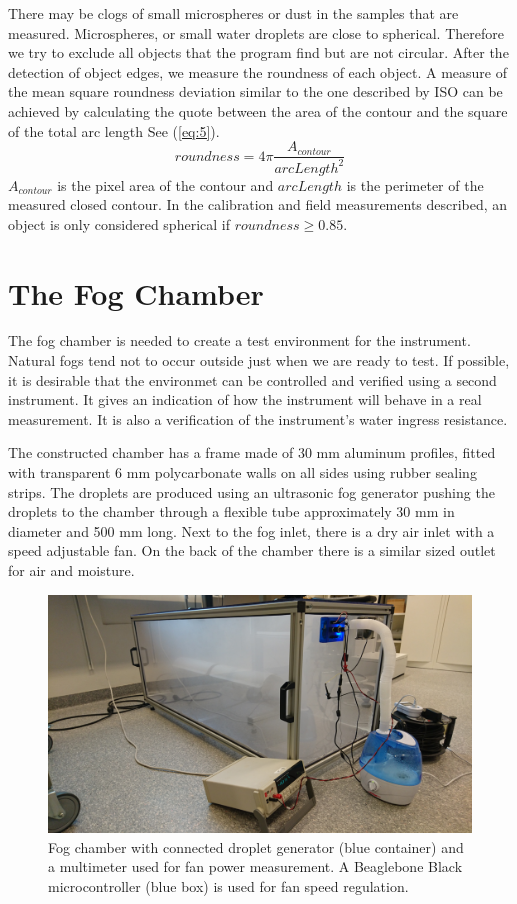 There may be clogs of small microspheres or dust in the samples that are measured. Microspheres, or small water droplets are close to spherical. Therefore we try to exclude all objects that the program find but are not circular. After the detection of object edges, we measure the roundness of each object. A measure of the mean square roundness deviation similar to the one described by ISO \cite{iso12181} can be achieved by calculating the quote between the area of the contour and the square of the total arc length See (\cref{eq:5}).
\begin{equation}
roundness = 4\pi \frac{A_{contour}}{arcLength^2}
\label{eq:5}
\end{equation}
$A_{contour}$ is the pixel area of the contour and $arcLength$ is the perimeter of the measured closed contour. In the calibration and field measurements described, an object is only considered spherical if $roundness \geq 0.85$.


\section{The Fog Chamber}
The fog chamber is needed to create a test environment for the instrument. Natural fogs tend not to occur outside just when we are ready to test. If possible, it is desirable that the environmet can be controlled and verified using a second instrument. It gives an indication of how the instrument will behave in a real measurement. It is also a verification of the instrument’s water ingress resistance.

The constructed chamber has a frame made of 30 mm aluminum profiles, fitted with transparent 6 mm polycarbonate walls on all sides using rubber sealing strips. The droplets are produced using an ultrasonic fog generator pushing the droplets to the chamber through a flexible tube approximately 30 mm in diameter and 500 mm long. Next to the fog inlet, there is a dry air inlet with a speed adjustable fan. On the back of the chamber there is a similar sized outlet for air and moisture.
 
\begin{figure}[ht]
\centering\includegraphics[width=0.75\linewidth]{figures/DSC_0103}
\caption{Fog chamber with connected droplet generator (blue container) and a multimeter used for fan power measurement. A Beaglebone Black microcontroller (blue box) is used for fan speed regulation.}
\end{figure}

